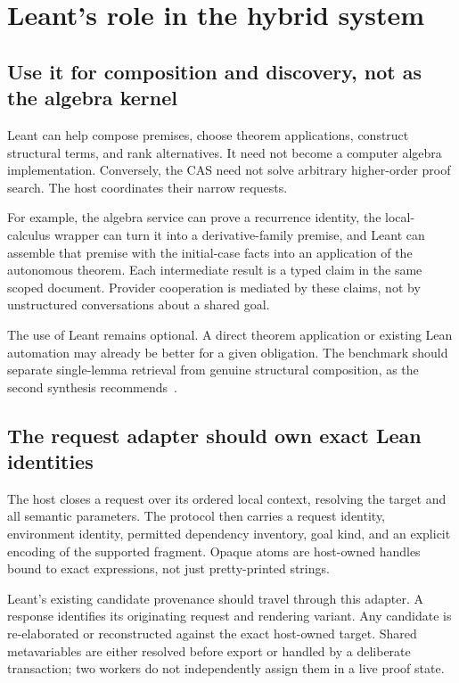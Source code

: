 \documentclass[11pt,a4paper]{article}
\theoremstyle{definition}
\theoremstyle{remark}
\begin{document}
\section{Leant's role in the hybrid system}\label{sec:leant}
\subsection{Use it for composition and discovery, not as the algebra kernel}
Leant can help compose premises, choose theorem applications, construct structural terms, and rank alternatives. It need not become a computer algebra implementation. Conversely, the CAS need not solve arbitrary higher-order proof search. The host coordinates their narrow requests.

For example, the algebra service can prove a recurrence identity, the local-calculus wrapper can turn it into a derivative-family premise, and Leant can assemble that premise with the initial-case facts into an application of the autonomous theorem. Each intermediate result is a typed claim in the same scoped document. Provider cooperation is mediated by these claims, not by unstructured conversations about a shared goal.

The use of Leant remains optional. A direct theorem application or existing Lean automation may already be better for a given obligation. The benchmark should separate single-lemma retrieval from genuine structural composition, as the second synthesis recommends~\cite{synB}.

\subsection{The request adapter should own exact Lean identities}
The host closes a request over its ordered local context, resolving the target and all semantic parameters. The protocol then carries a request identity, environment identity, permitted dependency inventory, goal kind, and an explicit encoding of the supported fragment. Opaque atoms are host-owned handles bound to exact expressions, not just pretty-printed strings.

Leant's existing candidate provenance should travel through this adapter. A response identifies its originating request and rendering variant. Any candidate is re-elaborated or reconstructed against the exact host-owned target. Shared metavariables are either resolved before export or handled by a deliberate transaction; two workers do not independently assign them in a live proof state.
\end{document}
